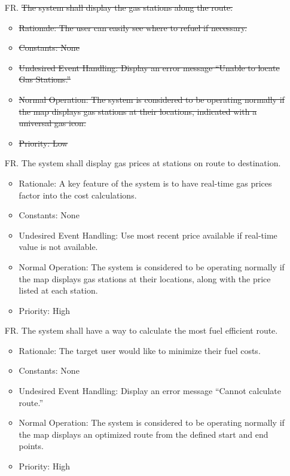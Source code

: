 \documentclass[12pt]{article}
\newcounter{reqnum} %
\begin{document}
\begin{itemize}
\item[FR\refstepcounter{reqnum}\thereqnum. ] \sout{The system shall display the gas stations along the route.}
\begin{itemize}
    \item \sout{Rationale: The user can easily see where to refuel if necessary.}
    \item \sout{Constants: None}
    \item \sout{Undesired Event Handling: Display an error message “Unable to locate Gas Stations.”}
    \item \sout{Normal Operation: The system is considered to be operating normally if the map displays gas stations at their locations, indicated with a universal gas icon.}
    \item \sout{Priority: Low}
\end{itemize}

\item[FR\refstepcounter{reqnum}\thereqnum. ] The system shall display gas prices at stations on route to destination.
\begin{itemize}
    \item Rationale: A key feature of the system is to have real-time gas prices factor into the cost calculations.
    \item Constants: None
    \item Undesired Event Handling: Use most recent price available if real-time value is not available.
    \item Normal Operation: The system is considered to be operating normally if the map displays gas stations at their locations, along with the price listed at each station.
	\item Priority: High
\end{itemize}

\item[FR\refstepcounter{reqnum}\thereqnum. ] The system shall have a way to calculate the most fuel efficient route.
\begin{itemize}
    \item Rationale: The target user would like to minimize their fuel costs.
    \item Constants: None
    \item Undesired Event Handling: Display an error message “Cannot calculate route.”
    \item Normal Operation: The system is considered to be operating normally if the map displays an optimized route from the defined start and end points.
	\item Priority: High
\end{itemize}


\end{itemize}
\end{document}
